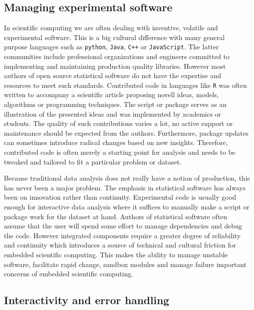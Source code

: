 \subsection{Managing experimental software}

In scientific computing we are often dealing with inventive, volatile and experimental  software. This is a big cultural difference with many general purpose languages such as \texttt{python}, \texttt{Java}, \texttt{C++} or \texttt{JavaScript}. The latter communities include professional organizations and engineers committed to implementing and maintaining production quality libraries. However most authors of open source statistical software do not have the expertise and resources to meet such standards. Contributed code in languages like \texttt{R} was often written to accompany a scientific article proposing novell ideas, models, algorithms or programming techniques. The script or package serves as an illustration of the presented ideas and was implemented by academics or students. The quality of such contributions varies a lot, no active support or maintenance should be expected from the authors. Furthermore, package updates can sometimes introduce radical changes based on new insights. Therefore, contributed code is often merely a starting point for analysis and needs to be tweaked and tailored to fit a particular problem or dataset.

Because traditional data analysis does not really have a notion of production, this has never been a major problem. The emphasis in statistical software has always been on innovation rather than continuity. Experimental code is usually good enough for interactive data analysis where it suffices to manually make a script or package work for the dataset at hand.
Authors of statistical software often assume that the user will spend some effort to manage dependencies and debug the code. However integrated components require a greater degree of reliability and continuity which introduces a source of technical and cultural friction for embedded scientific computing. 
This makes the ability to manage unstable software, facilitate rapid change, sandbox modules and manage failure important concerns of embedded scientific computing.

\subsection{Interactivity and error handling}

